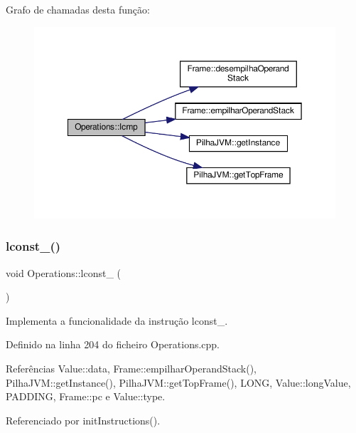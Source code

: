 Grafo de chamadas desta função\+:
\nopagebreak
\begin{figure}[H]
\begin{center}
\leavevmode
\includegraphics[width=350pt]{classOperations_a7ad4ad0e417096686b55dde9142b830a_cgraph}
\end{center}
\end{figure}
\mbox{\label{classOperations_a89586a819a6e67c2168d7d6e43f087ef}} 
\subsubsection{\texorpdfstring{lconst\+\_()}{lconst\_0()}}
{\footnotesize\ttfamily void Operations\+::lconst\+\_ (\begin{DoxyParamCaption}{ }\end{DoxyParamCaption})\hspace{0.3cm}{\ttfamily [private]}}



Implementa a funcionalidade da instrução lconst\+\_. 



Definido na linha 204 do ficheiro Operations.\+cpp.



Referências Value\+::data, Frame\+::empilhar\+Operand\+Stack(), Pilha\+J\+V\+M\+::get\+Instance(), Pilha\+J\+V\+M\+::get\+Top\+Frame(), L\+O\+NG, Value\+::long\+Value, P\+A\+D\+D\+I\+NG, Frame\+::pc e Value\+::type.



Referenciado por init\+Instructions().

